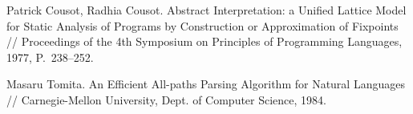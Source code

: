 \documentclass{llncs}
\begin{document}
\begin{thebibliography}{}
Patrick Cousot, Radhia Cousot. Abstract Interpretation: a Unified Lattice Model for Static Analysis 
of Programs by Construction or Approximation of Fixpoints // Proceedings of the 4th Symposium on Principles of Programming Languages, 1977, P.~238--252.

Masaru Tomita.
An Efficient All-paths Parsing Algorithm for Natural Languages //
Carnegie-Mellon University, Dept. of Computer Science, 1984.

%
%
\end{thebibliography}


\end{document}
